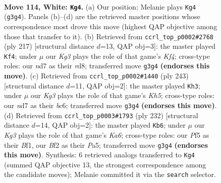 \documentclass[11pt]{article}
\begin{document}
\clearpage

\begin{figure}[p]\centering
\begin{subfigure}{0.46\textwidth}\centering
\resizebox{\linewidth}{!}{%
\newchessgame
\chessboard[
  setfen={6k1/3n4/8/5P2/p7/P5KP/5B2/8 w - - 47 114},
  showmover=false,
  pgfstyle=straightmove, color=movearrow, markmove={g3-g4}
]}
\caption{}
\end{subfigure}\hfill
\begin{subfigure}{0.46\textwidth}\centering
\resizebox{\linewidth}{!}{%
\newchessgame
\chessboard[
  setfen={3R4/8/8/4pk1p/3pb2P/8/4K3/8 b - - 7 109},
  showmover=false,
  pgfstyle=straightmove, color=movearrow, markmove={f5-f4}
]}
\caption{}
\end{subfigure}
\\[4pt]
\begin{subfigure}{0.46\textwidth}\centering
\resizebox{\linewidth}{!}{%
\newchessgame
\chessboard[
  setfen={8/8/2B5/6b1/3p2pk/8/4K3/8 b - - 37 122},
  showmover=false,
  pgfstyle=straightmove, color=movearrow, markmove={h4-h3}
]}
\caption{}
\end{subfigure}\hfill
\begin{subfigure}{0.46\textwidth}\centering
\resizebox{\linewidth}{!}{%
\newchessgame
\chessboard[
  setfen={1k6/8/K7/P1p3b1/2P5/8/8/5B2 w - - 9 117},
  showmover=false,
  pgfstyle=straightmove, color=movearrow, markmove={a6-b6}
]}
\caption{}
\end{subfigure}
\caption{\textbf{Move 114, White: \texttt{Kg4}.} (a) Our position; Melanie plays \texttt{Kg4} (\texttt{g3g4}). Panels (b)--(d) are the retrieved master positions whose correspondence most drove this move (highest QAP objective among those that transfer to it). (b) Retrieved from \texttt{ccrl\_top\_p0002\#2768} (ply 217) [structural distance $d$=13, QAP obj=3]: the master played \texttt{Kf4}; under $\mu$ our \emph{Kg3} plays the role of that game's \emph{Kf4}; cross-type roles: our \emph{n}d7 as their \emph{r}d8; transferred move \texttt{g3g4} \textbf{(endorses this move)}. (c) Retrieved from \texttt{ccrl\_top\_p0002\#1440} (ply 243) [structural distance $d$=11, QAP obj=2]: the master played \texttt{Kh3}; under $\mu$ our \emph{Kg3} plays the role of that game's \emph{Kh5}; cross-type roles: our \emph{n}d7 as their \emph{b}c6; transferred move \texttt{g3g4} \textbf{(endorses this move)}. (d) Retrieved from \texttt{ccrl\_top\_p0003\#1793} (ply 232) [structural distance $d$=14, QAP obj=2]: the master played \texttt{Kb6}; under $\mu$ our \emph{Kg3} plays the role of that game's \emph{Ka6}; cross-type roles: our \emph{P}f5 as their \emph{B}f1, our \emph{B}f2 as their \emph{P}a5; transferred move \texttt{g3g4} \textbf{(endorses this move)}. Synthesis: 6 retrieved analogs transferred to \texttt{Kg4} (summed QAP objective 13, the strongest correspondence among the candidate moves); Melanie committed it via the \texttt{search} selector.}
\label{fig:thought-m226}
\end{figure}
\end{document}
